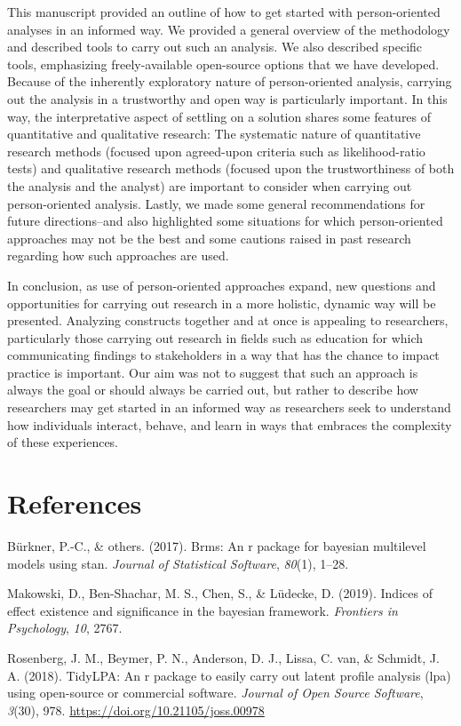 \documentclass[
  english,
  man]{apa6}
\begin{document}
This manuscript provided an outline of how to get started with person-oriented
analyses in an informed way. We provided a general overview of the methodology
and described tools to carry out such an analysis. We also described specific
tools, emphasizing freely-available open-source options that we have developed.
Because of the inherently exploratory nature of person-oriented analysis,
carrying out the analysis in a trustworthy and open way is particularly
important. In this way, the interpretative aspect of settling on a solution
shares some features of quantitative and qualitative research: The systematic
nature of quantitative research methods (focused upon agreed-upon criteria such
as likelihood-ratio tests) and qualitative research methods (focused upon the
trustworthiness of both the analysis and the analyst) are important to consider
when carrying out person-oriented analysis. Lastly, we made some general
recommendations for future directions--and also highlighted some situations for
which person-oriented approaches may not be the best and some cautions raised in
past research regarding how such approaches are used.

In conclusion, as use of person-oriented approaches expand, new questions and
opportunities for carrying out research in a more holistic, dynamic way will be
presented. Analyzing constructs together and at once is appealing to
researchers, particularly those carrying out research in fields such as
education for which communicating findings to stakeholders in a way that has the
chance to impact practice is important. Our aim was not to suggest that such an
approach is always the goal or should always be carried out, but rather to
describe how researchers may get started in an informed way as researchers seek
to understand how individuals interact, behave, and learn in ways that embraces
the complexity of these experiences.

\newpage

\hypertarget{references}{%
\section{References}\label{references}}

\begingroup
\setlength{\parindent}{-0.5in}
\setlength{\leftskip}{0.5in}

\hypertarget{refs}{}
\leavevmode\hypertarget{ref-burkner2017}{}%
Bürkner, P.-C., \& others. (2017). Brms: An r package for bayesian multilevel models using stan. \emph{Journal of Statistical Software}, \emph{80}(1), 1--28.

\leavevmode\hypertarget{ref-makowski2019}{}%
Makowski, D., Ben-Shachar, M. S., Chen, S., \& Lüdecke, D. (2019). Indices of effect existence and significance in the bayesian framework. \emph{Frontiers in Psychology}, \emph{10}, 2767.

\leavevmode\hypertarget{ref-R-tidyLPA}{}%
Rosenberg, J. M., Beymer, P. N., Anderson, D. J., Lissa, C. van, \& Schmidt, J. A. (2018). TidyLPA: An r package to easily carry out latent profile analysis (lpa) using open-source or commercial software. \emph{Journal of Open Source Software}, \emph{3}(30), 978. \url{https://doi.org/10.21105/joss.00978}

\endgroup
\end{document}
